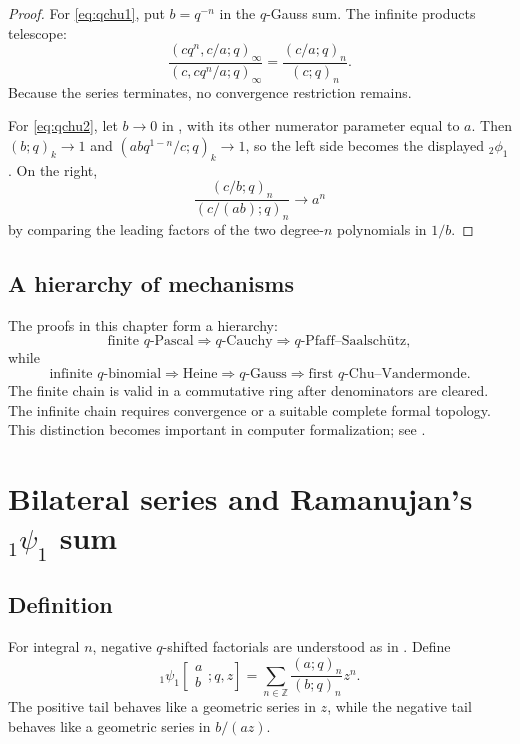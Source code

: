 \documentclass[11pt,oneside,openany]{book}
\theoremstyle{definition}
\theoremstyle{remark}
\newcommand{\Z}{\mathbb Z}
\begin{document}
\begin{proof}
For \eqref{eq:qchu1}, put $b=q^{-n}$ in the $q$-Gauss sum.  The infinite products telescope:
\[
 \frac{(cq^n,c/a;q)_\infty}{(c,cq^n/a;q)_\infty}
 =\frac{(c/a;q)_n}{(c;q)_n}.
\]
Because the series terminates, no convergence restriction remains.

For \eqref{eq:qchu2}, let $b\to0$ in , with its other numerator parameter equal to $a$.  Then $(b;q)_k\to1$ and $(abq^{1-n}/c;q)_k\to1$, so the left side becomes the displayed ${}_2\phi_1$.  On the right,
\[
 \frac{(c/b;q)_n}{(c/(ab);q)_n}\longrightarrow a^n
\]
by comparing the leading factors of the two degree-$n$ polynomials in $1/b$.
\end{proof}

\section{A hierarchy of mechanisms}

The proofs in this chapter form a hierarchy:
\[
 \text{finite $q$-Pascal}
 \Longrightarrow \text{$q$-Cauchy}
 \Longrightarrow \text{$q$-Pfaff--Saalsch\"utz},
\]
while
\[
 \text{infinite $q$-binomial}
 \Longrightarrow \text{Heine}
 \Longrightarrow \text{$q$-Gauss}
 \Longrightarrow \text{first $q$-Chu--Vandermonde}.
\]
The finite chain is valid in a commutative ring after denominators are cleared.  The infinite chain requires convergence or a suitable complete formal topology.  This distinction becomes important in computer formalization; see .

\chapter{Bilateral series and Ramanujan's \texorpdfstring{${}_1\psi_1$}{1psi1} sum}\label{chap:bilateral}

\section{Definition}

For integral $n$, negative $q$-shifted factorials are understood as in .  Define
\[
 {}_1\psi_1\!\left[\begin{matrix}a\\b\end{matrix};q,z\right]
 =\sum_{n\in\Z}\frac{(a;q)_n}{(b;q)_n}z^n.
\]
The positive tail behaves like a geometric series in $z$, while the negative tail behaves like a geometric series in $b/(az)$.
\end{document}
